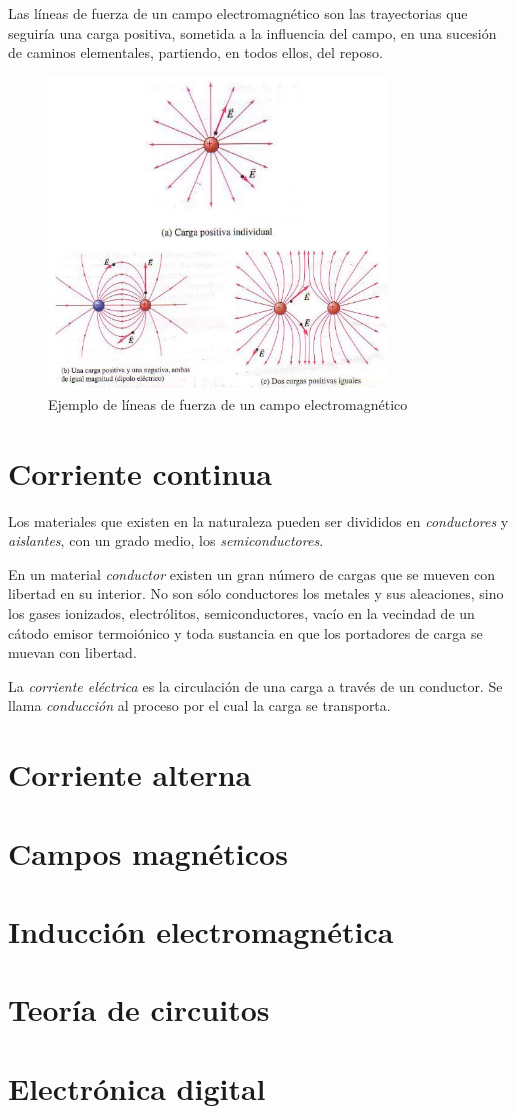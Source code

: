 \documentclass[11pt, oneside, titlepage]{article}
\begin{document}
Las líneas de fuerza de un campo electromagnético son las trayectorias que seguiría una carga positiva, sometida a la influencia del campo, en una sucesión de caminos elementales, partiendo, en todos ellos, del reposo.
\begin{figure}[htp]
\centering
\includegraphics[width=0.8\textwidth]{resources/electrostatica_lineasfuerza.png}
\caption{Ejemplo de líneas de fuerza de un campo electromagnético}
\label{}
\end{figure}

\section{Corriente continua}
Los materiales que existen en la naturaleza pueden ser divididos en \emph{conductores} y \emph{aislantes}, con un grado medio, los \emph{semiconductores}.

En un material \emph{conductor} existen un gran número de cargas que se mueven con libertad en su interior. No son sólo conductores los metales y sus aleaciones, sino los gases ionizados, electrólitos, semiconductores, vacío en la vecindad de un cátodo emisor termoiónico y toda sustancia en que los portadores de carga se muevan con libertad.

La \emph{corriente eléctrica} es la circulación de una carga a través de un conductor. Se llama \emph{conducción} al proceso por el cual la carga se transporta.

\section{Corriente alterna}
\section{Campos magnéticos}
\section{Inducción electromagnética}
\section{Teoría de circuitos}
\section{Electrónica digital}
\end{document}
